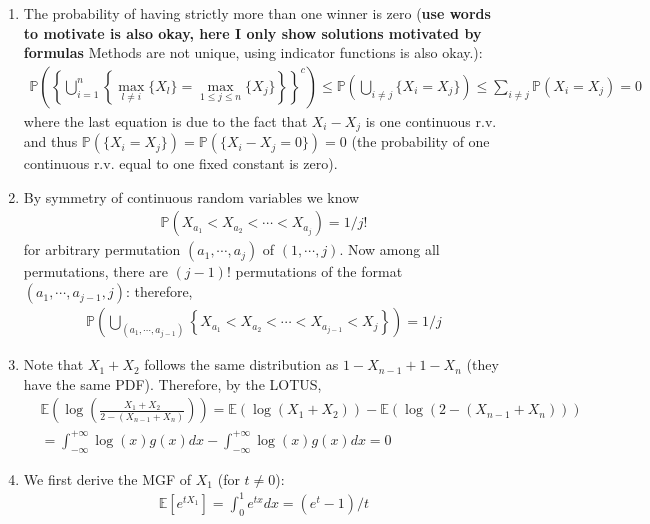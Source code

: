 \begin{Solution}{1.29}
  	\begin{enumerate}
  		\item 		 The probability of having strictly more than one winner is zero (\textbf{use words to motivate is also okay, here I only show solutions motivated by formulas} Methods are not unique, using indicator functions is also okay.):
  		\begin{align*}
  			\mathbb{P}\left(\left\{ \bigcup_{i=1}^n \left\{ \max_{l\neq i} \{X_l\} =\max_{1\leq j \leq n} \{X_j\} \right\}    \right\}^c\right) \leq \mathbb{P}\left( \bigcup_{i\neq j} \{ X_i =X_j \} \right) \leq \sum_{i\neq j} \mathbb{P}\left( X_i =X_j \right)=0
  		\end{align*}	
  		where the last equation is due to the fact that $X_i-X_j$ is one continuous r.v. and thus $\mathbb{P}\left( \{ X_i =X_j \} \right) = \mathbb{P}\left( \{ X_i-X_j =0\} \right)=0$ (the probability of one continuous r.v. equal to one fixed constant is zero).
  		\item			By symmetry of continuous random variables we know
  		\begin{align*}
  			\mathbb{P}\left(X_{a_1}<X_{a_2}<\cdots < X_{a_j} \right) =1/j!
  		\end{align*}	
  		for arbitrary permutation $(a_1,\cdots, a_j)$ of $(1,\cdots, j)$. Now among all permutations, there are $(j-1)!$ permutations of the format  $(a_1,\cdots, a_{j-1}, j)$: therefore,
  		\begin{align*}
  			\mathbb{P}\left(\bigcup_{(a_1,\cdots, a_{j-1})}\left\{X_{a_1}<X_{a_2}<\cdots < X_{a_{j-1}}<X_j\right\} \right) =1/j
  		\end{align*}
  	\item 			Note that  $X_1+X_2$ follows the same distribution as $1-X_{n-1}+1-X_n$ (they have the same PDF). Therefore, by the LOTUS,
  	\begin{align*}
  		&\mathbb{E} \left(\log\left(\frac{X_1+X_2}{2-(X_{n-1}+X_{n})} \right) \right)=\mathbb{E}\left(\log\left({X_1+X_2} \right) \right)- \mathbb{E}\left(\log\left( {2-(X_{n-1}+X_{n})} \right) \right) \\&= \int_{-\infty}^{+\infty} \log(x)g(x)dx- \int_{-\infty}^{+\infty} \log(x)g(x)dx =0
  	\end{align*}
  \item 			We first derive the MGF  of $X_1$ (for $t\neq 0$):
  \begin{align*}
  	\mathbb{E}[e^{tX_1}] =\int_{0}^{1} e^{tx} dx =  (e^t-1)/t
  \end{align*}	

\end{enumerate}
\end{Solution}
